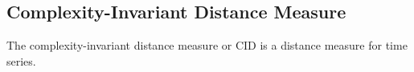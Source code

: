 \subsection{Complexity-Invariant Distance Measure}
The complexity-invariant distance measure \cite{batista2011complexity} or CID is a distance measure for time series.
